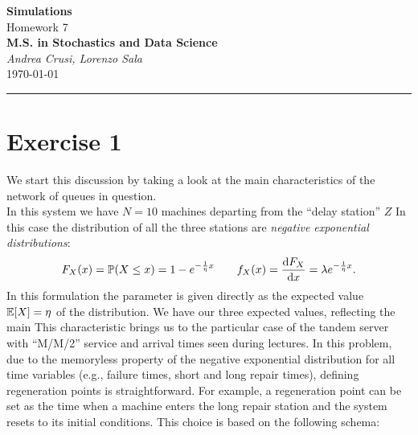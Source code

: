 \documentclass[12pt]{article}
\begin{document}
	\textcolor{UM_Brown}{
		\begin{center}
			\textbf{\Large Simulations}\\
			\vspace{5pt}
			Homework 7 \\
			\vspace{5pt}
			\textbf{M.S. in Stochastics and Data Science}\\
			\vspace{20pt}
			\textit{Andrea Crusi, Lorenzo Sala} \\
			\vspace{5pt}
			\today
		\end{center}
		\vspace{10pt}
		\hrule
	}
	
	
	
	
	\section{Exercise 1}
	We start this discussion by taking a look at the main characteristics of the network of queues in question.\\
	In this system we have $N=10$ machines departing from the ``delay station'' $Z$
	In this case the distribution of all the three stations are \emph{negative exponential distributions}:
	\begin{equation*}
		F_X(x)=\mathbb{P}(X\leq x)=1-e^{-\frac{1}{\eta} x}\qquad f_X(x)=\frac{\mathop{}\!\mathrm{d} F_X}{\mathop{}\!\mathrm{d} x}=\lambda e^{-\frac{1}{\eta} x}.
	\end{equation*}
	In this formulation the parameter is given directly as the expected value $\mathbb{E}[X]=\eta$ of the distribution. We have our three expected values, reflecting the main 
	This characteristic brings us to the particular case of the tandem server with ``M/M/2'' service and arrival times seen during lectures. 
In this problem, due to the memoryless property of the negative exponential distribution for all time variables (e.g., failure times, short and long repair times), defining regeneration points is straightforward. For example, a regeneration point can be set as the time when a machine enters the long repair station and the system resets to its initial conditions. This choice is based on the following schema:
		
\end{document}
